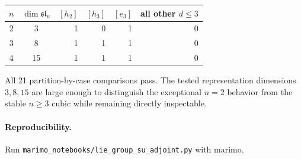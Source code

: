 \documentclass[10pt]{article}
\begin{document}
\begin{center}\small
\begin{tabular}{@{}c|c|rrrr@{}}\toprule
$n$&$\dim\mathfrak{sl}_n$&$[h_2]$&$[h_3]$&$[e_3]$&all other $d\le3$\\\midrule
2&3&1&0&1&0\\
3&8&1&1&1&0\\
4&15&1&1&1&0\\\bottomrule
\end{tabular}
\end{center}
All 21 partition-by-case comparisons pass.  The tested representation
dimensions $3,8,15$ are large enough to distinguish the exceptional $n=2$
behavior from the stable $n\ge3$ cubic while remaining directly inspectable.

\paragraph{Reproducibility.} Run \texttt{marimo\_notebooks/lie\_group\_su\_adjoint.py} with marimo.
\end{document}
